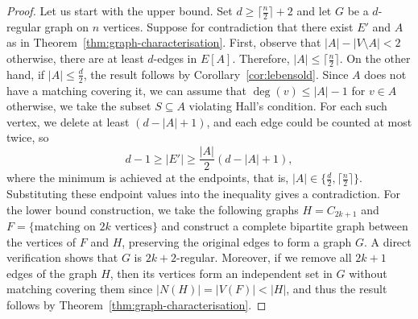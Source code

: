 \documentclass[12pt,UKenglish]{amsart}
\theoremstyle{plain}
\theoremstyle{definition}
\theoremstyle{remark}
\begin{document}
\begin{proof}
  Let us start with the upper bound.
 Set $d\ge\lceil\frac{n}{2}\rceil+2$ and let $G$ be a $d$-regular graph on $n$ vertices.
 Suppose for contradiction that there exist $E'$ and $A$ as in Theorem~\ref{thm:graph-characterisation}.
 First, observe that $|A|-|V\setminus A|<2$ otherwise, there are at least $d$-edges in $E[A]$. Therefore, $|A|\le\lceil\frac{n}{2}\rceil$.
 On the other hand, if $|A|\le\frac{d}{2}$, the result follows by Corollary~\ref{cor:lebensold}.
 Since $A$ does not have a matching covering it, we can assume that $\deg(v)\le|A|-1$ for $v\in A$ otherwise, we take the subset $S\subseteq A$ violating Hall's condition.
 For each such vertex, we delete at least $(d-|A|+1)$, and each edge could be counted at most twice, so 
  \[d-1\ge|E'|\ge \frac{|A|}{2}(d-|A|+1),\]
 where the minimum is achieved at the endpoints, that is, $|A|\in\{\frac{d}{2},\lceil\frac{n}{2}\rceil\}$.
 Substituting these endpoint values into the inequality gives a contradiction.
 \noindent For the lower bound construction, we take the following graphs $H=C_{2k+1}$ and $F=\{\text{matching on $2k$ vertices\}}$ and construct a complete bipartite graph between the vertices of $F$ and $H$, preserving the original edges to form a graph $G$.
 A direct verification shows that $G$ is $2k+2$-regular. Moreover, if we remove all $2k+1$ edges of the graph $H$, then its vertices form an independent set in $G$ without matching covering them since $|N(H)|=|V(F)|<|H|$, and thus the result follows by Theorem~\ref{thm:graph-characterisation}.
 \end{proof}
\end{document}
